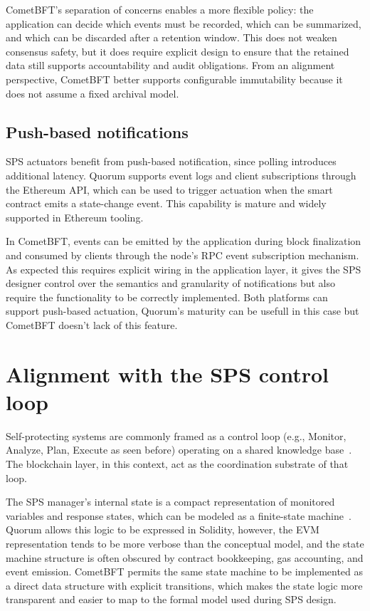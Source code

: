CometBFT's separation of concerns enables a more flexible policy: the application can decide which events must be recorded, which can be summarized, and which can be discarded after a retention window. This does not weaken consensus safety, but it does require explicit design to ensure that the retained data still supports accountability and audit obligations. From an alignment perspective, CometBFT better supports configurable immutability because it does not assume a fixed archival model.

\subsection{Push-based notifications}
SPS actuators benefit from push-based notification, since polling introduces additional latency. Quorum supports event logs and client subscriptions through the Ethereum API, which can be used to trigger actuation when the smart contract emits a state-change event. This capability is mature and widely supported in Ethereum tooling.

In CometBFT, events can be emitted by the application during block finalization and consumed by clients through the node's RPC event subscription mechanism. As expected this requires explicit wiring in the application layer, it gives the SPS designer control over the semantics and granularity of notifications but also require the functionality to be correctly implemented. Both platforms can support push-based actuation, Quorum's maturity can be usefull in this case but CometBFT doesn't lack of this feature.

\section{Alignment with the SPS control loop}
Self-protecting systems are commonly framed as a control loop (e.g., Monitor, Analyze, Plan, Execute as seen before) operating on a shared knowledge base~\cite{kephart2003vision, yuan2014systematic}. The blockchain layer, in this context, act as the coordination substrate of that loop.

The SPS manager's internal state is a compact representation of monitored variables and response states, which can be modeled as a finite-state machine~\cite{iannucci2018model}. Quorum allows this logic to be expressed in Solidity, however, the EVM representation tends to be more verbose than the conceptual model, and the state machine structure is often obscured by contract bookkeeping, gas accounting, and event emission. CometBFT permits the same state machine to be implemented as a direct data structure with explicit transitions, which makes the state logic more transparent and easier to map to the formal model used during SPS design.

